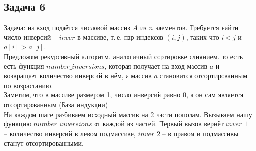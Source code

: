 \documentclass[a4paper,12pt]{article} %
\begin{document}
\subsection*{Задача 6}
Задача: на вход подаётся числовой массив $A$ из $n$ элементов. Требуется найти число инверсий -- $ inver $ в массиве, т.\,е. пар индексов $(i,j)$, таких что $i<j$ и $a[i] > a[j]$.\\
Предложим рекурсивный алгоритм, аналогичный сортировке слиянием, то есть есть функция $ number\_inversions $, которая получает на вход массив $ a $ и возвращает количество инверсий в нём, а массив $ a $ становится отсортированным по возрастанию.\\
Заметим, что в массиве размером 1, число инверсий равно 0, а он сам является отсортированным (База индукции)\\
На каждом шаге разбиваем исходный массив на 2 части пополам. Вызываем нашу функцию $ number \_ inversions $ от каждой из частей. Первый вызов вернёт $ inver\_1 $ -- количество инверсий в левом подмассиве, $ inver\_2 $ -- в правом и подмассивы станут отсортированными.\\
\end{document}
